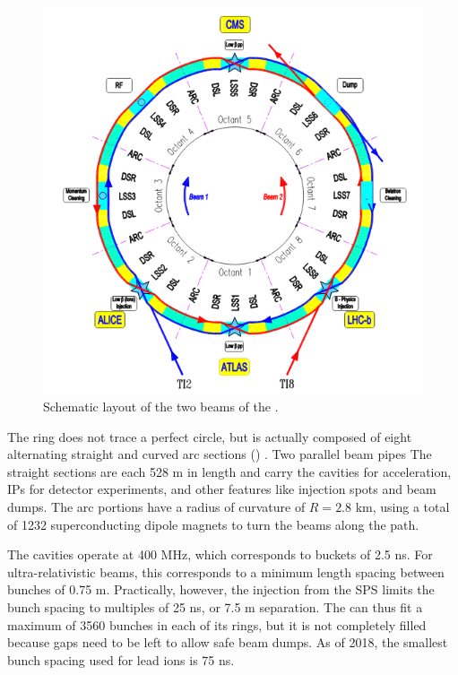 \begin{figure}[t]
\includegraphics{LHC_schematic.png}
\caption{Schematic layout of the two beams of the \lhc \cite{Bruning:2004ej}.}
\label{fig:lhc_schematic}
\end{figure}

The \lhc ring does not trace a perfect circle, but is actually composed of eight alternating straight and curved arc sections () \cite{Bruning:2004ej}.
Two parallel beam pipes 
The straight sections are each 528 m in length and carry the \rf cavities for acceleration, IPs for detector experiments, and other features like injection spots and beam dumps.
The arc portions have a radius of curvature of $R = 2.8$ km, using a total of 1232 superconducting dipole magnets to turn the beams along the path.

The \rf cavities operate at 400 MHz, which corresponds to \rf buckets of 2.5 ns.
For ultra-relativistic beams, this corresponds to a minimum length spacing between bunches of 0.75 m.
Practically, however, the injection from the \ac{SPS} limits the bunch spacing to multiples of 25 ns, or 7.5 m separation.
The \lhc can thus fit a maximum of 3560 bunches in each of its rings, but it is not completely filled because gaps need to be left to allow safe beam dumps.
As of 2018, the smallest bunch spacing used for lead ions is 75 ns.

